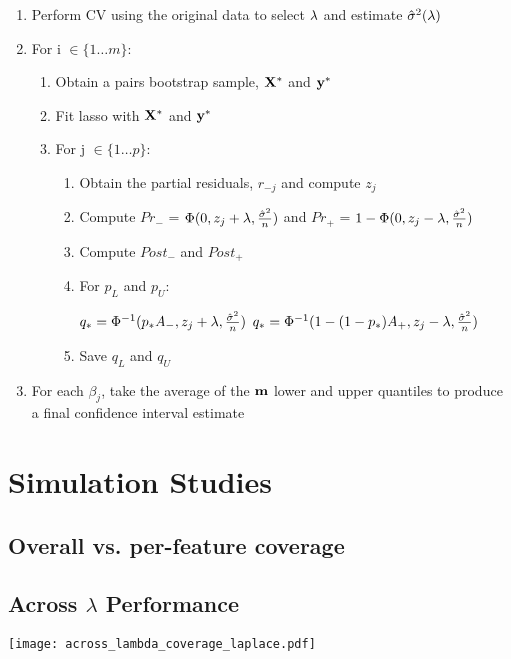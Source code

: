 \begin{enumerate}
\item Perform CV using the original data to select $\lambda$ and estimate $\hat{\sigma}^2(\lambda)$
\item For i $\in \lbrace 1 \ldots m \rbrace$:
\begin{enumerate}
\item Obtain a pairs bootstrap sample, $\mathbf{X}^*$ and $\mathbf{y}^*$
\item Fit lasso with $\mathbf{X}^*$ and $\mathbf{y}^*$
\item For j $\in \lbrace 1 \ldots p \rbrace$:
	\begin{enumerate}
	\item Obtain the partial residuals, $r_{-j}$ and compute $z_j$
	\item Compute $Pr_{-}$ = $\Phi(0, z_j + \lambda, \frac{\hat{\sigma}^2}{n})$ and $Pr_{+}$ = $1 - \Phi(0, z_j - \lambda, \frac{\hat{\sigma}^2}{n})$
	\item Compute $Post_-$ and $Post_+$
	\item For $p_L$ and $p_U$:
	\begin{algorithmic}
			\State $q_* = \Phi^{-1}(p_* A_{-}, z_j + \lambda, \frac{\hat{\sigma}^2}{n})$
		\Else
			\State $q_* = \Phi^{-1}(1 - (1 - p_*)A_{+}, z_j - \lambda, \frac{\hat{\sigma}^2}{n})$
		\EndIf
	\end{algorithmic}
	\item Save $q_L$ and $q_U$
	\end{enumerate}
\end{enumerate}
\item For each $\beta_j$, take the average of the $\mathbf{m}$ lower and upper quantiles to produce a final confidence interval estimate
\end{enumerate}

\section{Simulation Studies}

\subsection{Overall vs. per-feature coverage}

\subsection{Across \texorpdfstring{$\lambda$}{lambda} Performance}
\texttt{[image: across\_lambda\_coverage\_laplace.pdf]}

